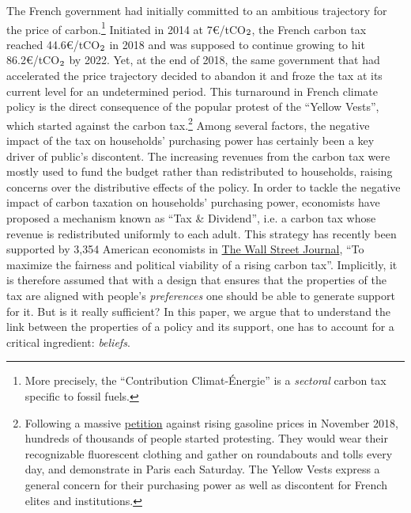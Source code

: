 \documentclass[12pt]{article} %
\begin{document}
The French government had initially committed to an ambitious trajectory for the price of carbon.\footnote{More precisely, the ``Contribution Climat-Énergie'' is a \textit{sectoral} carbon tax specific to fossil fuels.} Initiated in 2014 at 7\euro/tCO$_\textnormal{2}$, the French carbon tax reached 44.6\euro/tCO$_\textnormal{2}$ in 2018 and was supposed to continue growing to hit 86.2\euro/tCO$_\textnormal{2}$ by 2022. Yet, at the end of 2018, the same government that had accelerated the price trajectory decided to abandon it and froze the tax at its current level for an undetermined period. This turnaround in French climate policy is the direct consequence of the popular protest of the ``Yellow Vests'', which started against the carbon tax.\footnote{Following a massive \href{https://www.change.org/p/pour-une-baisse-des-prix-\%C3\%A0-la-pompe-essence-diesel}{petition} against rising gasoline prices in November 2018, hundreds of thousands of people started protesting. They would wear their recognizable fluorescent clothing and gather on roundabouts and tolls every day, and demonstrate in Paris each Saturday. The Yellow Vests express a general concern for their purchasing power as well as discontent for French elites and institutions.} Among several factors, the negative impact of the tax on households' purchasing power has certainly been a key driver of public's discontent. The increasing revenues from the carbon tax were mostly used to fund the budget rather than redistributed to households, raising concerns over the distributive effects of the policy. In order to tackle the negative impact of carbon taxation on households' purchasing power, economists have proposed a mechanism known as ``Tax \& Dividend'', i.e. a carbon tax whose revenue is redistributed uniformly to each adult. This strategy has recently been supported by 3,354 American economists in \href{https://www.clcouncil.org/media/EconomistsStatement.pdf}{The Wall Street Journal}, ``To maximize the fairness and political viability of a rising carbon tax''. Implicitly, it is therefore assumed that with a design that ensures that the properties of the tax are aligned with people's \textit{preferences} one should be able to generate support for it. But is it really sufficient? In this paper, we argue that to understand the link between the properties of a policy and its support, one has to account for a critical ingredient: \textit{beliefs}.
\end{document}
